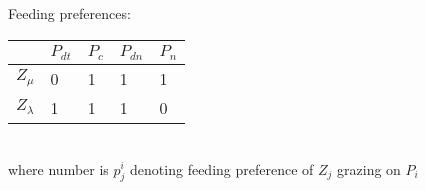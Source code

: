 \documentclass[11pt,letterpaper,english]{article}
\begin{document}
\\\\\\\\
Feeding preferences: \\
\noindent
\begin{tabular}{l|l|l|l|l}
 
  & $P_{dt}$ & $P_{c}$ & $P_{dn}$ & $P_{n}$\\
\hline
$Z_{\mu}$ & 0 & 1 & 1 & 1\\
\hline
$Z_{\lambda}$ & 1 & 1 & 1 & 0\\
\hline
\end{tabular}
\\
where number is $p^i_j$ denoting feeding preference of $Z_j$ grazing on $P_i$
\end{document}
